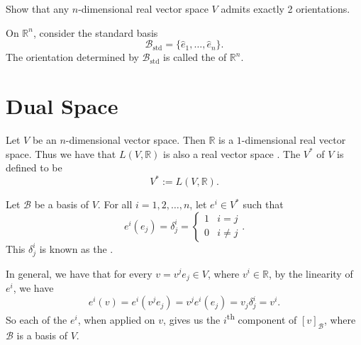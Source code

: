 \documentclass[notoc,notitlepage]{tufte-book}
\DeclareMathOperator{\std}{std}
\begin{document}
\begin{ex}[A1Q1]
  Show that any $n$-dimensional real vector space $V$ admits exactly 2 orientations.
\end{ex}

\begin{eg}
  On $\mathbb{R}^n$, consider the standard basis
  \begin{equation*}
    \mathcal{B}_{\std} = \{ \hat{e}_1, \ldots, \hat{e}_n \}.
  \end{equation*}
  The orientation determined by $\mathcal{B}_{\std}$ is called the  of $\mathbb{R}^n$.
\end{eg}


\section{Dual Space}%
\label{sec:dual_space}

\begin{defn}\label{defn:dual_space}
  Let $V$ be an $n$-dimensional vector space.
  Then $\mathbb{R}$ is a $1$-dimensional real vector space.
  Thus we have that $L(V, \mathbb{R})$ is also a real vector space
  .
  The  $V^*$ of $V$ is defined to be
  \begin{equation*}
    V^* := L(V, \mathbb{R}).
  \end{equation*}
\end{defn}

Let $\mathcal{B}$ be a basis of $V$. For all $i = 1, 2, \ldots, n$, let $e^i \in V^*$ such that
\begin{equation*}
  e^i(e_j) = \delta^i_j = \begin{cases}
    1 & i = j \\
    0 & i \neq j
  \end{cases}.
\end{equation*}
This $\delta^i_j$ is known as the .

In general, we have that for every $v = v^j e_j \in V$, where $v^i \in \mathbb{R}$,
by the linearity of $e^i$, we have
\begin{equation*}
  e^i(v) = e^i(v^j e_j) = v^j e^i(e_j) = v_j \delta^i_j = v^i.
\end{equation*}
So each of the $e^i$, when applied on $v$,
gives us the $i$\textsuperscript{th} component of $[v]_{\mathcal{B}}$,
where $\mathcal{B}$ is a basis of $V$.
\end{document}
